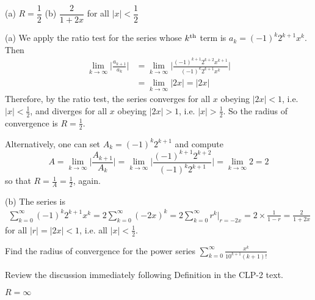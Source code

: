 \begin{answer}
(a) $R = \dfrac{1}{2}$\qquad
(b) $\dfrac{2}{1+2x}$ for all $|x|<\dfrac{1}{2}$
\end{answer}

\begin{solution} (a)
We apply the ratio test for the series whose $k^{\rm th}$
term is $a_k= (-1)^k 2^{k+1} x^k$. Then
\begin{align*}
\lim_{k\to\infty} \bigg| \frac{ a_{k+1} }{ a_k } \bigg|
&= \lim_{k\to\infty} \bigg| \frac{(-1)^{k+1} 2^{k+2} x^{k+1}}
                            {(-1)^k 2^{k+1} x^k} \bigg| \\
&= \lim_{k\to\infty}|2x| = |2x|
\end{align*}
Therefore, by the ratio test, the series converges for all $x$
obeying $|2x|<1$, i.e. $|x|<\frac{1}{2}$, and diverges for all $x$
obeying $|2x|>1$, i.e. $|x|>\frac{1}{2}$.
So the radius of convergence is $R = \frac{1}{2}$.

Alternatively, one can set $A_k = (-1)^k 2^{k+1}$ and compute
\begin{equation*}
A = \lim_{k\to\infty} \bigg| \frac{A_{k+1}}{A_k}\bigg|
  = \lim_{k\to\infty} \bigg| \frac{(-1)^{k+1} 2^{k+2}}{(-1)^k 2^{k+1}}\bigg|
  = \lim_{k\to\infty} 2
  =2
\end{equation*}
so that $R=\frac{1}{A}=\frac{1}{2}$, again.

\noindent (b) The series is
\begin{align*}
\sum_{k=0}^\infty (-1)^k 2^{k+1} x^k
=2 \sum_{k=0}^\infty (-2x)^k
=2\sum_{k=0}^\infty r^k\Big|_{r=-2x}
=2\times\frac{1}{1-r}
=\frac{2}{1+2x}
\end{align*}
for all $|r|=|2x|<1$, i.e. all $|x|<\frac{1}{2}$.


\end{solution}



\begin{Mquestion}[M105 2014A]
Find the radius of convergence for the power series
$\displaystyle\sum_{k=0}^\infty \frac{x^k}{10^{k+1}(k+1)!}$
\end{Mquestion}

\begin{hint}
Review the discussion immediately following Definition
 in the
CLP-2 text.
\end{hint}

\begin{answer}
$R = \infty$
\end{answer}


